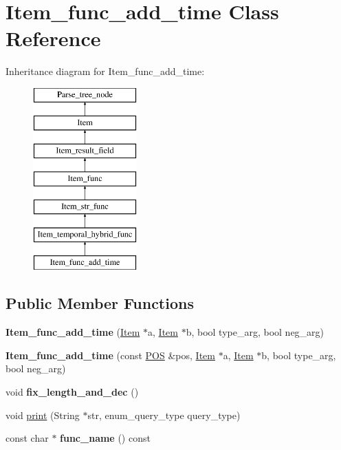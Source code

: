 \hypertarget{classItem__func__add__time}{}\section{Item\+\_\+func\+\_\+add\+\_\+time Class Reference}
\label{classItem__func__add__time}
Inheritance diagram for Item\+\_\+func\+\_\+add\+\_\+time\+:\begin{figure}[H]
\begin{center}
\leavevmode
\includegraphics[height=7.000000cm]{classItem__func__add__time}
\end{center}
\end{figure}
\subsection*{Public Member Functions}
\begin{DoxyCompactItemize}
\item 
\mbox{\label{classItem__func__add__time_acf7684d8ad02cff6178dff3396bdf2ba}} 
{\bfseries Item\+\_\+func\+\_\+add\+\_\+time} (\mbox{\hyperlink{classItem}{Item}} $\ast$a, \mbox{\hyperlink{classItem}{Item}} $\ast$b, bool type\+\_\+arg, bool neg\+\_\+arg)
\item 
\mbox{\label{classItem__func__add__time_aa0bbe5f6331446b6beb372c89e56e1b8}} 
{\bfseries Item\+\_\+func\+\_\+add\+\_\+time} (const \mbox{\hyperlink{structYYLTYPE}{P\+OS}} \&pos, \mbox{\hyperlink{classItem}{Item}} $\ast$a, \mbox{\hyperlink{classItem}{Item}} $\ast$b, bool type\+\_\+arg, bool neg\+\_\+arg)
\item 
\mbox{\label{classItem__func__add__time_ae288374c96b38fd1cac2bf04c6e59dc2}} 
void {\bfseries fix\+\_\+length\+\_\+and\+\_\+dec} ()
\item 
void \mbox{\hyperlink{classItem__func__add__time_a29dd981b554a30df77ea0c3a24fd308c}{print}} (String $\ast$str, enum\+\_\+query\+\_\+type query\+\_\+type)
\item 
\mbox{\label{classItem__func__add__time_ab3b36cbef510497403c0e76420a22f66}} 
const char $\ast$ {\bfseries func\+\_\+name} () const
\end{DoxyCompactItemize}
